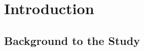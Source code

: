 \clearpage
{}
\setcounter{page}{1}

\label{ch:intro}
\chapter{Introduction}


\section{Background to the Study}
\label{sec:background}

